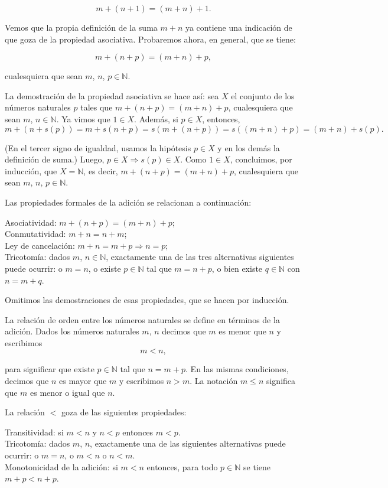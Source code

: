 \[m + (n + 1) = (m + n) + 1.\]

Vemos que la propia definición de la suma \(m + n\) ya contiene una indicación de que goza de la propiedad asociativa. Probaremos ahora, en general, que se tiene:

\[m + (n + p) = (m + n) + p,\]

cualesquiera que sean \(m\), \(n\), \(p \in \mathbb{N}\).

La demostración de la propiedad asociativa se hace así: sea \(X\) el conjunto de los números naturales \(p\) tales que \(m + (n + p) = (m + n) + p\), cualesquiera que sean \(m\), \(n \in \mathbb{N}\). Ya vimos que \(1 \in X\). Además, si \(p \in X\), entonces,
\[m + (n + s(p)) = m + s(n + p) = s(m + (n + p)) = s((m + n) + p) = (m + n) + s(p).\]

(En el tercer signo de igualdad, usamos la hipótesis \(p \in X\) y en los demás la definición de suma.) Luego, \(p \in X \Rightarrow s(p) \in X\). Como \(1 \in X\), concluimos, por inducción, que \(X = \mathbb{N}\), es decir, \(m + (n + p) = (m + n) + p\), cualesquiera que sean \(m\), \(n\), \(p \in \mathbb{N}\).

Las propiedades formales de la adición se relacionan a continuación:

Asociatividad: \(m + (n + p) = (m + n) + p\);\\
Conmutatividad: \(m + n = n + m\);\\
Ley de cancelación: \(m + n = m + p \Rightarrow n = p\);\\
Tricotomía: dados \(m\), \(n \in \mathbb{N}\), exactamente una de las tres alternativas siguientes puede ocurrir: o \(m = n\), o existe \(p \in \mathbb{N}\) tal que \(m = n + p\), o bien existe \(q \in \mathbb{N}\) con \(n = m + q\).

Omitimos las demostraciones de esas propiedades, que se hacen por inducción.

La relación de orden entre los números naturales se define en términos de la adición. Dados los números naturales \(m\), \(n\) decimos que \(m\) es menor que \(n\) y escribimos
\[m < n,\]

para significar que existe \(p \in \mathbb{N}\) tal que \(n = m + p\). En las mismas condiciones, decimos que \(n\) es mayor que \(m\) y escribimos \(n > m\). La notación \(m \leq n\) significa que \(m\) es menor o igual que \(n\).

La relación \(<\) goza de las siguientes propiedades:

Transitividad: si \(m < n\) y \(n < p\) entonces \(m < p\).\\
Tricotomía: dados \(m\), \(n\), exactamente una de las siguientes alternativas puede ocurrir: o \(m = n\), o \(m < n\) o \(n < m\).\\
Monotonicidad de la adición: si \(m < n\) entonces, para todo \(p \in \mathbb{N}\) se tiene \(m + p < n + p\).

